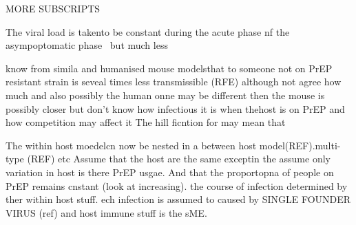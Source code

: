 \documentclass[DIV=15]{scrartcl}
\begin{document}
MORE SUBSCRIPTS 


The viral  load is takento  be constant during the acute phase nf the asympoptomatic phase~\cite{hollingsworth2008} but much less



know from simila and humanised mouse modelsthat to someone not on PrEP resistant strain is seveal times less transmissible (RFE) although not agree how much and also  possibly the human onne may be different then the mouse is possibly closer but don't know how infectious it is when thehost is on PrEP and how competition may affect it  The hill ficntion for may mean that   
  

  


The  within host moedelcn now be nested  in a between host model(REF).multi-type (REF) etc  Assume that the host are the same exceptin the
assume only variation in host is there PrEP  usgae. And that the proportopna of people on PrEP  remains cnstant (look at increasing). the course of  infection determined by  ther within host stuff.  ech infection  is assumed to caused by  SINGLE  FOUNDER VIRUS (ref) and host immune stuff is  the sME. 
\end{document}
